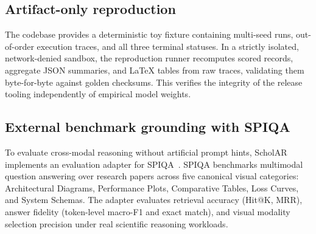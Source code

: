 \subsection{Artifact-only reproduction}
The codebase provides a deterministic toy fixture containing multi-seed runs, out-of-order execution traces, and all three terminal statuses. In a strictly isolated, network-denied sandbox, the reproduction runner recomputes scored records, aggregate JSON summaries, and \LaTeX{} tables from raw traces, validating them byte-for-byte against golden checksums. This verifies the integrity of the release tooling independently of empirical model weights.

\subsection{External benchmark grounding with SPIQA}
To evaluate cross-modal reasoning without artificial prompt hints, ScholAR implements an evaluation adapter for \textsc{SPIQA}~\citep{banerjee2024spiqa}. SPIQA benchmarks multimodal question answering over research papers across five canonical visual categories: Architectural Diagrams, Performance Plots, Comparative Tables, Loss Curves, and System Schemas. The adapter evaluates retrieval accuracy (Hit@K, MRR), answer fidelity (token-level macro-F1 and exact match), and visual modality selection precision under real scientific reasoning workloads.
